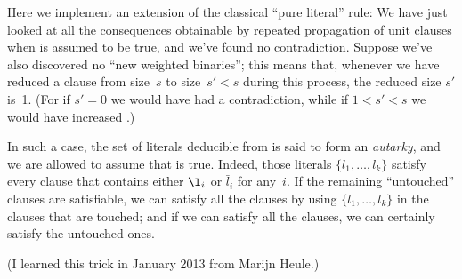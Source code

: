 Here we implement an extension of the classical ``pure
literal'' rule:
We have just looked at all the consequences obtainable by repeated propagation
of unit clauses when  is assumed to be true, and we've
found no contradiction. Suppose we've also
discovered no ``new weighted binaries''; this means that, whenever
we have reduced a clause from size~$s$ to size~$s'<s$ during this process,
the reduced size $s'$ is~1. (For if $s'=0$ we would have had a contradiction,
while if $1<s'<s$ we would have increased .)

In such a case, the set of literals deducible from  is said to
form an {\it autarky}, and we are allowed to assume that  is
true. Indeed, those literals $\{l_1,\ldots,l_k\}$ satisfy every clause that
contains either $\l_i$ or $\bar l_i$ for any~$i$. If the remaining
``untouched'' clauses are satisfiable, we can satisfy all the clauses by using
$\{l_1,\ldots,l_k\}$ in the clauses that are touched; and if we can
satisfy all the clauses, we can certainly satisfy the untouched ones.

(I learned this trick in January 2013 from Marijn Heule.)


